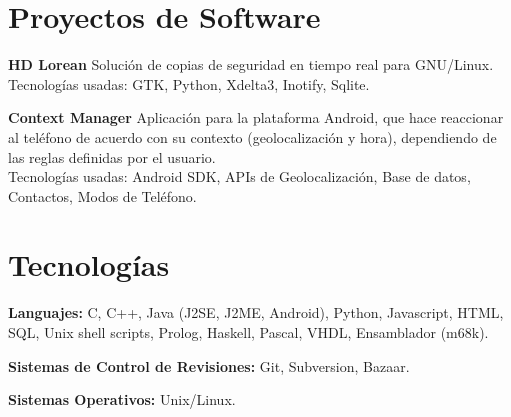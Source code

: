 \documentclass[margin,line]{resume}
\begin{document}
\begin{resume}
\section{\sc Proyectos de Software } 
\begin{list1}
\item[] {\bf HD Lorean}
Solución de copias de seguridad en tiempo real para GNU/Linux.\\
Tecnologías usadas: GTK, Python, Xdelta3, Inotify, Sqlite.\\

\item[] {\bf Context Manager}
Aplicación para la plataforma Android, que hace reaccionar al teléfono 
de acuerdo con su contexto (geolocalización y hora), dependiendo de las reglas definidas por el usuario.\\
Tecnologías usadas: Android SDK, APIs de Geolocalización, Base de datos,
Contactos, Modos de Teléfono.
\end{list1}

\section{\sc Tecnologías} 
\begin{list2}
\item {\bf Languajes:} C, C++, Java (J2SE, J2ME, Android), Python,
Javascript, HTML, SQL, Unix shell scripts, Prolog, Haskell, Pascal, VHDL,
Ensamblador (m68k).
\item {\bf Sistemas de Control de Revisiones:} Git, Subversion, Bazaar.
\item {\bf Sistemas Operativos:} Unix/Linux. 
\end{list2}


\end{resume}
\end{document}
